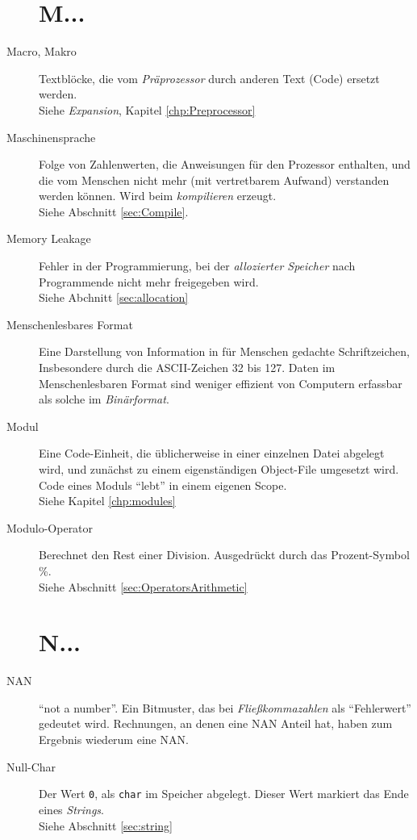 \begin{appendices}
\begin{description}
\section*{M...}
\item[Macro, Makro] Textblöcke, die vom \emph{Präprozessor} durch anderen Text (Code) ersetzt werden.\\
	Siehe \emph{Expansion}, Kapitel \ref{chp:Preprocessor}
\item[Maschinensprache] Folge von Zahlenwerten, die Anweisungen für den Prozessor enthalten, und die
	vom Menschen nicht mehr (mit vertretbarem Aufwand) verstanden werden können. Wird beim
	\emph{kompilieren} erzeugt.\\
	Siehe Abschnitt \ref{sec:Compile}.
\item[Memory Leakage] Fehler in der Programmierung, bei der \emph{allozierter Speicher} nach
	Programmende nicht mehr freigegeben wird.\\
	Siehe Abchnitt \ref{sec:allocation}
\item[Menschenlesbares Format] Eine Darstellung von Information in für Menschen gedachte Schriftzeichen,
	Insbesondere durch die ASCII-Zeichen 32 bis 127. Daten im Menschenlesbaren Format sind \idR weniger
	effizient von Computern erfassbar als solche im \emph{Binärformat}.
\item[Modul] Eine Code-Einheit, die üblicherweise in einer einzelnen Datei abgelegt wird, und zunächst
	zu einem eigenständigen Object-File umgesetzt wird. Code eines Moduls \enquote{lebt} in einem
	eigenen Scope.\\
	Siehe Kapitel \ref{chp:modules}
\item[Modulo-Operator] Berechnet den Rest einer Division. Ausgedrückt durch das Prozent-Symbol \%.\\
	Siehe Abschnitt \ref{sec:OperatorsArithmetic}

\section*{N...}
\item[NAN] \enquote{not a number}. Ein Bitmuster, das bei \emph{Fließkommazahlen} als
	\enquote{Fehlerwert} gedeutet wird. Rechnungen, an denen eine NAN Anteil hat, haben zum Ergebnis
	wiederum eine NAN.
\item[Null-Char] Der Wert \texttt{0}, als \texttt{char} im Speicher abgelegt. Dieser Wert
	markiert das Ende eines \emph{Strings}.\\
	Siehe Abschnitt \ref{sec:string}


\end{description}
\end{appendices}
